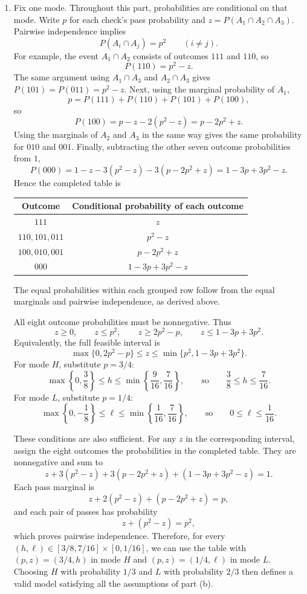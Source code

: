 \documentclass[11pt,a4paper]{article}
\newcommand{\Prob}{P}
\begin{document}
\begin{enumerate}
\item Fix one mode. Throughout this part, probabilities are conditional
on that mode. Write $p$ for each check's pass probability and
$z=\Prob(A_1\cap A_2\cap A_3)$.
Pairwise independence implies
\[
\Prob(A_i\cap A_j)=p^2\qquad(i\ne j).
\]
For example, the event $A_1\cap A_2$ consists of outcomes $111$ and $110$,
so
\[
\Prob(110)=p^2-z.
\]
The same argument using $A_1\cap A_3$ and $A_2\cap A_3$ gives
$\Prob(101)=\Prob(011)=p^2-z$.
Next, using the marginal probability of $A_1$,
\[
p=\Prob(111)+\Prob(110)+\Prob(101)+\Prob(100),
\]
so
\[
\Prob(100)=p-z-2(p^2-z)=p-2p^2+z.
\]
Using the marginals of $A_2$ and $A_3$ in the same way gives the same
probability for $010$ and $001$. Finally, subtracting the other seven
outcome probabilities from $1$,
\[
\Prob(000)=1-z-3(p^2-z)-3(p-2p^2+z)
=1-3p+3p^2-z.
\]
Hence the completed table is
\begin{center}
\begin{tabular}{cc}
\toprule
Outcome & Conditional probability of each outcome\\\midrule
$111$ & $z$\\
$110,101,011$ & $p^2-z$\\
$100,010,001$ & $p-2p^2+z$\\
$000$ & $1-3p+3p^2-z$\\\bottomrule
\end{tabular}
\end{center}
The equal probabilities within each grouped row follow from the equal
marginals and pairwise independence, as derived above.

All eight outcome probabilities must be nonnegative. Thus
\[
z\ge0,\qquad z\le p^2,\qquad
z\ge2p^2-p,\qquad z\le1-3p+3p^2.
\]
Equivalently, the full feasible interval is
\[
\max\{0,2p^2-p\}\le z\le\min\{p^2,1-3p+3p^2\}.
\]
For mode $H$, substitute $p=3/4$:
\[
\max\left\{0,\frac38\right\}\le h
\le\min\left\{\frac9{16},\frac7{16}\right\},
\qquad\text{so}\qquad
\boxed{\frac38\le h\le\frac7{16}}.
\]
For mode $L$, substitute $p=1/4$:
\[
\max\left\{0,-\frac18\right\}\le\ell
\le\min\left\{\frac1{16},\frac7{16}\right\},
\qquad\text{so}\qquad
\boxed{0\le\ell\le\frac1{16}}.
\]

These conditions are also sufficient. For any $z$ in the corresponding
interval, assign the eight outcomes the probabilities in the completed
table. They are nonnegative and sum to
\[
z+3(p^2-z)+3(p-2p^2+z)+(1-3p+3p^2-z)=1.
\]
Each pass marginal is
\[
z+2(p^2-z)+(p-2p^2+z)=p,
\]
and each pair of passes has probability
\[
z+(p^2-z)=p^2,
\]
which proves pairwise independence. Therefore, for every
$(h,\ell)\in[3/8,7/16]\times[0,1/16]$, we can use the table with
$(p,z)=(3/4,h)$ in mode $H$ and $(p,z)=(1/4,\ell)$ in mode $L$.
Choosing $H$ with probability $1/3$ and $L$ with probability $2/3$
then defines a valid model satisfying all the assumptions of part (b).


\end{enumerate}
\end{document}

